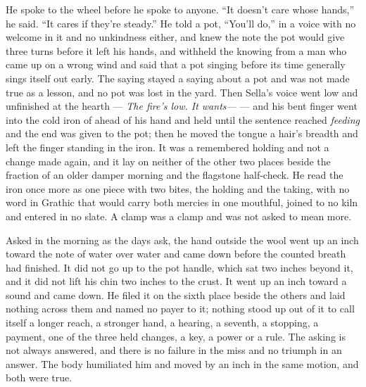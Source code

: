 He spoke to the wheel before he spoke to anyone. “It doesn't care whose hands,” he said. “It cares if they're steady.” He told a pot, “You'll do,” in a voice with no welcome in it and no unkindness either, and knew the note the pot would give three turns before it left his hands, and withheld the knowing from a man who came up on a wrong wind and said that a pot singing before its time generally sings itself out early. The saying stayed a saying about a pot and was not made true as a lesson, and no pot was lost in the yard. Then Sella's voice went low and unfinished at the hearth --- \emph{The fire's low. It wants---} --- and his bent finger went into the cold iron of  ahead of his hand and held until the sentence reached \emph{feeding} and the end was given to the pot; then he moved the tongue a hair's breadth and left the finger standing in the iron. It was a remembered holding and not a change made again, and it lay on neither of the other two places beside the fraction of an older damper morning and the flagstone half-check. He read the iron once more as one piece with two bites, the holding and the taking, with no word in Grathic that would carry both mercies in one mouthful, joined to no kiln and entered in no slate. A clamp was a clamp and was not asked to mean more.

\scenebreak

Asked in the morning as the days ask, the hand outside the wool went up an inch toward the note of water over water and came down before the counted breath had finished. It did not go up to the pot handle, which sat two inches beyond it, and it did not lift his chin two inches to the crust. It went up an inch toward a sound and came down. He filed it on the sixth place beside the others and laid nothing across them and named no payer to it; nothing stood up out of it to call itself a longer reach, a stronger hand, a hearing, a seventh, a stopping, a payment, one of the three held changes, a key, a power or a rule. The asking is not always answered, and there is no failure in the miss and no triumph in an answer. The body humiliated him and moved by an inch in the same motion, and both were true.

